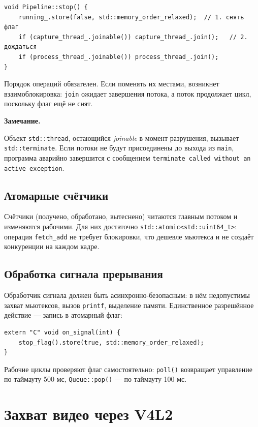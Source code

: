\documentclass[11pt,a4paper]{article}
\theoremstyle{definition}
\theoremstyle{remark}
\newenvironment{note}
  {\par\medskip\noindent
   \begin{lrbox}{\notebox}%
   \begin{minipage}{0.93\linewidth}%
   \small\textbf{Замечание.}\par\vspace{1pt}\noindent\ignorespaces}
  {\end{minipage}%
   \end{lrbox}%
   \fboxsep=6pt\relax
   \colorbox{codebg}{\usebox{\notebox}}%
   \par\medskip}
\begin{document}
\begin{lstlisting}
void Pipeline::stop() {
    running_.store(false, std::memory_order_relaxed);  // 1. снять флаг
    if (capture_thread_.joinable()) capture_thread_.join();   // 2. дождаться
    if (process_thread_.joinable()) process_thread_.join();
}
\end{lstlisting}

Порядок операций обязателен. Если поменять их местами, возникнет
взаимоблокировка: \texttt{join} ожидает завершения потока, а поток продолжает
цикл, поскольку флаг ещё не снят.

\begin{note}
Объект \texttt{std::thread}, остающийся \emph{joinable} в момент разрушения,
вызывает \texttt{std::terminate}. Если потоки не будут присоединены до выхода
из \texttt{main}, программа аварийно завершится с сообщением
\texttt{terminate called without an active exception}.
\end{note}

\subsection{Атомарные счётчики}

Счётчики (получено, обработано, вытеснено) читаются главным потоком и
изменяются рабочими. Для них достаточно \texttt{std::atomic<std::uint64\_t>}:
операция \texttt{fetch\_add} не требует блокировки, что дешевле мьютекса и не
создаёт конкуренции на каждом кадре.

\subsection{Обработка сигнала прерывания}

Обработчик сигнала должен быть асинхронно-безопасным: в нём недопустимы
захват мьютексов, вызов \texttt{printf}, выделение памяти. Единственное
разрешённое действие --- запись в атомарный флаг:

\begin{lstlisting}
extern "C" void on_signal(int) {
    stop_flag().store(true, std::memory_order_relaxed);
}
\end{lstlisting}

Рабочие циклы проверяют флаг самостоятельно: \texttt{poll()}
возвращает управление по таймауту 500 мс, \texttt{Queue::pop()} --- по
таймауту 100 мс.

\section{Захват видео через V4L2}
\label{sec:v4l2}
\end{document}
